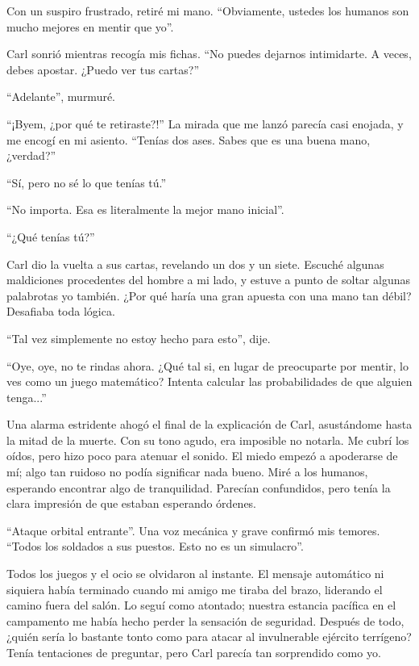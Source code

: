 \documentclass[spanish,12pt,a4paper,oneside,titlepage]{book}
\begin{document}
    Con un suspiro frustrado, retiré mi mano. ``Obviamente, ustedes los humanos son mucho mejores en mentir que yo''.

    Carl sonrió mientras recogía mis fichas. ``No puedes dejarnos intimidarte. A veces, debes apostar. ¿Puedo ver tus cartas?''

    ``Adelante'', murmuré.

    ``¡Byem, ¿por qué te retiraste?!'' La mirada que me lanzó parecía casi enojada, y me encogí en mi asiento. ``Tenías dos ases. Sabes que es una buena mano, ¿verdad?''

    ``Sí, pero no sé lo que tenías tú.''

    ``No importa. Esa es literalmente la mejor mano inicial''.

    ``¿Qué tenías tú?''

    Carl dio la vuelta a sus cartas, revelando un dos y un siete. Escuché algunas maldiciones procedentes del hombre a mi lado, y estuve a punto de soltar algunas palabrotas yo también. ¿Por qué haría una gran apuesta con una mano tan débil? Desafiaba toda lógica.

    ``Tal vez simplemente no estoy hecho para esto'', dije.

    ``Oye, oye, no te rindas ahora. ¿Qué tal si, en lugar de preocuparte por mentir, lo ves como un juego matemático? Intenta calcular las probabilidades de que alguien tenga...''

    Una alarma estridente ahogó el final de la explicación de Carl, asustándome hasta la mitad de la muerte. Con su tono agudo, era imposible no notarla. Me cubrí los oídos, pero hizo poco para atenuar el sonido. El miedo empezó a apoderarse de mí; algo tan ruidoso no podía significar nada bueno. Miré a los humanos, esperando encontrar algo de tranquilidad. Parecían confundidos, pero tenía la clara impresión de que estaban esperando órdenes.

    ``Ataque orbital entrante''. Una voz mecánica y grave confirmó mis temores. ``Todos los soldados a sus puestos. Esto no es un simulacro''.

    Todos los juegos y el ocio se olvidaron al instante. El mensaje automático ni siquiera había terminado cuando mi amigo me tiraba del brazo, liderando el camino fuera del salón. Lo seguí como atontado; nuestra estancia pacífica en el campamento me había hecho perder la sensación de seguridad. Después de todo, ¿quién sería lo bastante tonto como para atacar al invulnerable ejército terrígeno? Tenía tentaciones de preguntar, pero Carl parecía tan sorprendido como yo.
\end{document}
